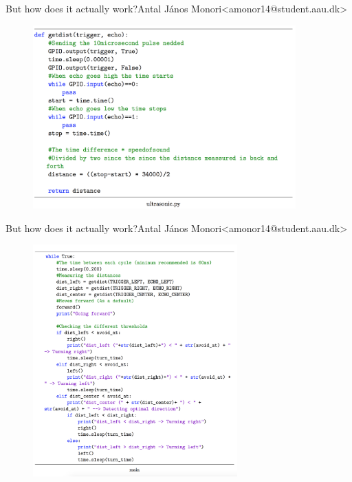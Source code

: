 \begin{frame}{But how does it actually work?}{Antal János Monori\newline<amonor14@student.aau.dk>}
	\begin{figure}[h!]
		\includegraphics[width=0.9\textwidth]{images/dissensor.png}
	\end{figure}
\end{frame}

\begin{frame}{But how does it actually work?}{Antal János Monori\newline<amonor14@student.aau.dk>}
	\begin{figure}[h!]
		\includegraphics[width=0.7\textwidth]{images/navcode.png}
	\end{figure}
\end{frame}


